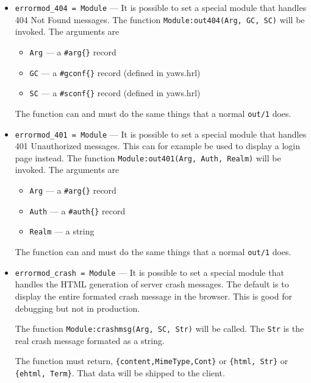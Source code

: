 \documentclass[11pt,oneside,english]{book}
\begin{document}
\begin{itemize}
\item       \verb+errormod_404 = Module+ ---
              It is possible to set a special module that handles 404 Not Found
              messages. The function \verb+Module:out404(Arg, GC, SC)+ will be
              invoked. The arguments are
              \begin{itemize}
              \item \verb+Arg+ --- a \verb+#arg{}+ record
              \item \verb+GC+ --- a \verb+#gconf{}+ record (defined in yaws.hrl)
              \item \verb+SC+ --- a \verb+#sconf{}+ record (defined in yaws.hrl)
              \end{itemize}
              The function can and must do the same things that a normal
              \verb+out/1+ does.

\item       \verb+errormod_401 = Module+ ---
              It is possible to set a special module that handles 401
              Unauthorized messages. This can for example be used to display a
              login page instead. The function
              \verb+Module:out401(Arg, Auth, Realm)+ will be invoked. The
              arguments are
              \begin{itemize}
              \item \verb+Arg+ --- a \verb+#arg{}+ record
              \item \verb+Auth+ --- a \verb+#auth{}+ record
              \item \verb+Realm+ --- a string
              \end{itemize}
              The function can and must do the same things that a normal
              \verb+out/1+ does.

\item       \verb+errormod_crash = Module+ ---
              It is possible to set a special module that handles the HTML
              generation of server crash messages. The default is to display the
              entire formated crash message in the browser. This is good for
              debugging but not in production.

              The function \verb+Module:crashmsg(Arg, SC, Str)+ will be
              called. The \verb+Str+ is the real crash message formated as a
              string.

              The function must return, \verb+{content,MimeType,Cont}+ or
              \verb+{html, Str}+ or \verb+{ehtml, Term}+. That data will be
              shipped to the client.


\end{itemize}
\end{document}
